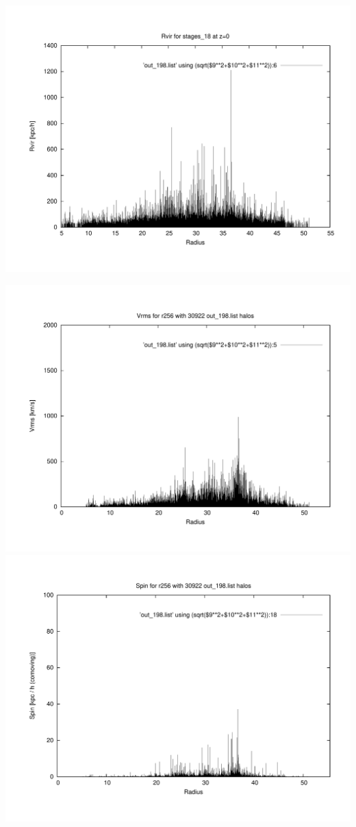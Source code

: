 \includegraphics[scale=0.3]{r256/stages_18/plot_rvir_z0.pdf}

\includegraphics[scale=0.3]{r256/stages_18/plot_Vrms_out_198.pdf}
\includegraphics[scale=0.3]{r256/stages_18/plot_spin_out_198.pdf}





